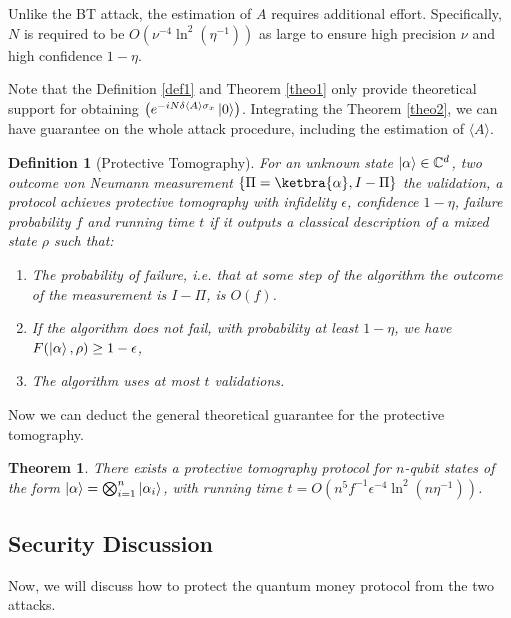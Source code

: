 \documentclass{article} %
\newtheorem{definition}{Definition}
\newtheorem{theorem}{Theorem}
\begin{document}
Unlike the BT attack, the estimation of $A$ requires additional effort. Specifically, $N$ is required to be $O(\nu^{-4}\ln^2(\eta^{-1}))$ as large to ensure high precision $\nu$ and high confidence $1-\eta$.

Note that the Definition \ref{def1} and Theorem \ref{theo1} only provide theoretical support for obtaining $\left(e^{-iN\delta \langle A\rangle \sigma_x} \ket{0} \right)$. Integrating the Theorem \ref{theo2}, we can have guarantee on the whole attack procedure, including the estimation of $\langle A\rangle$.

\begin{definition}[Protective Tomography]For an unknown state $\ket{\alpha} \in \mathbb{C}^d$, two outcome von Neumann measurement $\{ \Pi=\ketbra{\alpha}, I - \Pi \}$  the validation, a protocol achieves protective tomography with infidelity  $\epsilon$, confidence $1-\eta$, failure probability  $f$ and  running time $t$ if it outputs a classical description of a mixed state $\rho$ such that:
\begin{enumerate}
\item The probability of failure, i.e. that at some step of the algorithm the outcome of the measurement is $I-\Pi$, is $O(f)$.
\item If the algorithm does not fail, with probability at least $1-\eta$, we have $F(\ket{\alpha},\rho) \geq 1 - \epsilon$,
\item The algorithm uses at most $t$ validations.
\end{enumerate}

\label{def2}
\end{definition}

Now we can deduct the general theoretical guarantee for the protective tomography.

\begin{theorem}\label{theo3}
    There exists a protective tomography protocol for $n$-qubit states of the form $\ket{\alpha}=\bigotimes_{i=1}^n \ket{\alpha_i}$, with running time $t=O\left(n^5 f^{-1}\epsilon^{-4}\ln^2(n \eta^{-1})  \right)$.
\end{theorem}


\subsection{Security Discussion}
Now, we will discuss how to protect the quantum money protocol from the two attacks.
\end{document}

